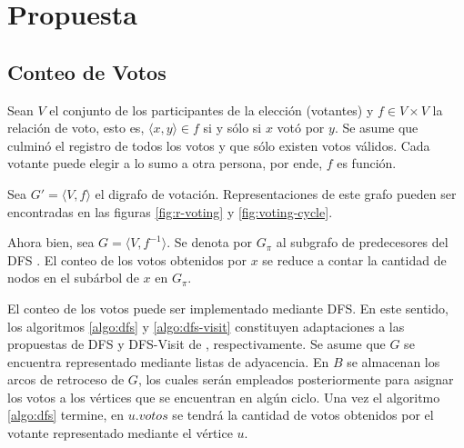 \chapter{Propuesta}\label{chapter:proposal}

\newcommand{\dfscaption}{\hyperref[algo:dfs]{DFS-Votos}}
\newcommand{\cyclevotescaption}{\hyperref[algo:votes-cycles]{Reasignar-Votos-en-Todos-los-Ciclos}}
\newcommand{\dfsvisitcaption}{\hyperref[algo:dfs-visit]{DFS-Votos-Visita}}
\newcommand{\initdfsvertices}{\hyperref[algo:init-dfs-vertices]{Inicializar-Propiedades-de-V\'ertices}}
\newcommand{\maxincyclecaption}{\hyperref[algo:max-in-cycle]{M\'ax-Votos-en-Ciclo}}
\newcommand{\setvotestoallincyclecaption}{\hyperref[algo:set-votes-all-in-cycle]{Reasignar-Votos-en-Ciclo}}

\section{Conteo de Votos}
Sean $V$ el conjunto de los participantes  de la elecci\'on (votantes) y $f \in V \times V$ la relaci\'on de voto, esto es, $ \langle x, y \rangle \in f $ si y s\'olo si $x$ vot\'o por $ y $.  Se asume que culmin\'o el registro de todos los votos y que s\'olo existen votos v\'alidos. Cada votante puede elegir a lo sumo a otra persona, por ende, $f$ es funci\'on.

Sea $G' = \langle V, f \rangle$ el digrafo de votaci\'on. Representaciones de este grafo pueden ser encontradas en las figuras \ref{fig:r-voting} y \ref{fig:voting-cycle}.

Ahora bien, sea $G = \langle V, f^{-1} \rangle$. Se denota por $G_\pi$ al subgrafo de predecesores del DFS \citep{intro-to-algo-3}. El conteo de los votos obtenidos por $x$ se reduce a contar la cantidad de nodos en el sub\'arbol de $x$ en $G_\pi$. 

El conteo de los votos puede ser implementado mediante DFS. En este sentido, los algoritmos \ref{algo:dfs} y \ref{algo:dfs-visit} constituyen adaptaciones   a las propuestas de DFS y DFS-Visit de \cite{intro-to-algo-3}, respectivamente. Se asume que $G$ se encuentra representado mediante listas de adyacencia. En $B$ se almacenan los arcos de retroceso de $G$, los cuales ser\'an empleados posteriormente para asignar los votos a los v\'ertices que se encuentran en alg\'un ciclo.  Una vez el algoritmo \ref{algo:dfs} termine, en $u.votos$ se tendr\'a la cantidad de votos obtenidos por el votante representado mediante el v\'ertice $u$.

